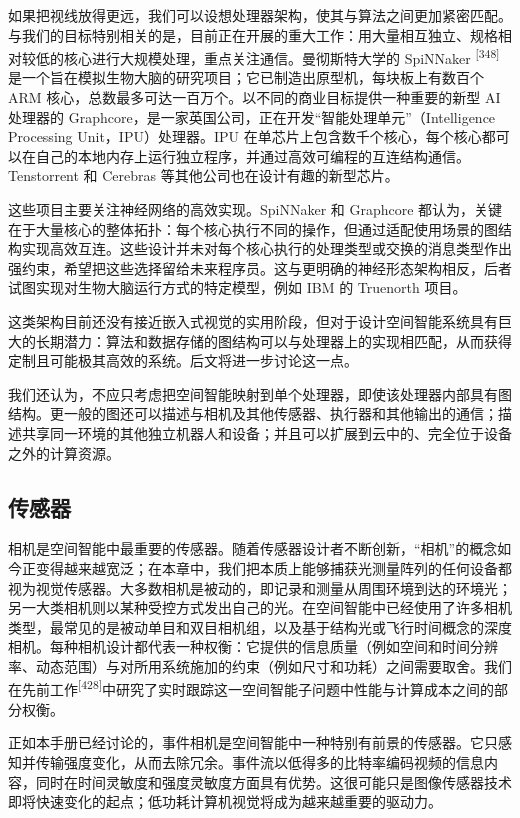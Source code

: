 如果把视线放得更远，我们可以设想处理器架构，使其与算法之间更加紧密匹配。与我们的目标特别相关的是，目前正在开展的重大工作：用大量相互独立、规格相对较低的核心进行大规模处理，重点关注通信。曼彻斯特大学的 SpiNNaker \textsuperscript{[348]} 是一个旨在模拟生物大脑的研究项目；它已制造出原型机，每块板上有数百个 ARM 核心，总数最多可达一百万个。以不同的商业目标提供一种重要的新型 AI 处理器的 Graphcore，是一家英国公司，正在开发“智能处理单元”（Intelligence Processing Unit，IPU）处理器。IPU 在单芯片上包含数千个核心，每个核心都可以在自己的本地内存上运行独立程序，并通过高效可编程的互连结构通信。Tenstorrent 和 Cerebras 等其他公司也在设计有趣的新型芯片。

这些项目主要关注神经网络的高效实现。SpiNNaker 和 Graphcore 都认为，关键在于大量核心的整体拓扑：每个核心执行不同的操作，但通过适配使用场景的图结构实现高效互连。这些设计并未对每个核心执行的处理类型或交换的消息类型作出强约束，希望把这些选择留给未来程序员。这与更明确的神经形态架构相反，后者试图实现对生物大脑运行方式的特定模型，例如 IBM 的 Truenorth 项目。

这类架构目前还没有接近嵌入式视觉的实用阶段，但对于设计空间智能系统具有巨大的长期潜力：算法和数据存储的图结构可以与处理器上的实现相匹配，从而获得定制且可能极其高效的系统。后文将进一步讨论这一点。

我们还认为，不应只考虑把空间智能映射到单个处理器，即使该处理器内部具有图结构。更一般的图还可以描述与相机及其他传感器、执行器和其他输出的通信；描述共享同一环境的其他独立机器人和设备；并且可以扩展到云中的、完全位于设备之外的计算资源。

\subsection{传感器}

相机是空间智能中最重要的传感器。随着传感器设计者不断创新，“相机”的概念如今正变得越来越宽泛；在本章中，我们把本质上能够捕获光测量阵列的任何设备都视为视觉传感器。大多数相机是被动的，即记录和测量从周围环境到达的环境光；另一大类相机则以某种受控方式发出自己的光。在空间智能中已经使用了许多相机类型，最常见的是被动单目和双目相机组，以及基于结构光或飞行时间概念的深度相机。每种相机设计都代表一种权衡：它提供的信息质量（例如空间和时间分辨率、动态范围）与对所用系统施加的约束（例如尺寸和功耗）之间需要取舍。我们在先前工作\textsuperscript{[428]}中研究了实时跟踪这一空间智能子问题中性能与计算成本之间的部分权衡。

正如本手册已经讨论的，事件相机是空间智能中一种特别有前景的传感器。它只感知并传输强度变化，从而去除冗余。事件流以低得多的比特率编码视频的信息内容，同时在时间灵敏度和强度灵敏度方面具有优势。这很可能只是图像传感器技术即将快速变化的起点；低功耗计算机视觉将成为越来越重要的驱动力。

